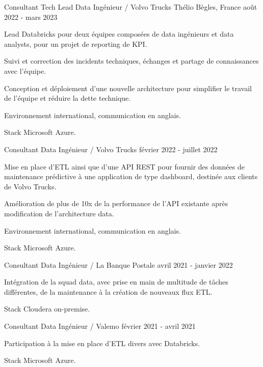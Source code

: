 \begin{cventries}
	\cventry
	{Consultant Tech Lead Data Ingénieur / Volvo Trucks}
	{Thélio}
	{Bègles, France}
	{août 2022 - mars 2023}
	{
		\begin{cvitems}
			\item {Lead Databricks pour deux équipes composées de data ingénieurs et data analysts, pour un projet de reporting de KPI.}
			\item {Suivi et correction des incidents techniques, échanges et partage de connaissances avec l'équipe.}
			\item {Conception et déploiement d'une nouvelle architecture pour simplifier le travail de l'équipe et réduire la dette technique.}
			\item {Environnement international, communication en anglais.}
			\item {Stack Microsoft Azure.}
		\end{cvitems}
	}
	
	\cventry
	{Consultant Data Ingénieur / Volvo Trucks}{}{}
	{février 2022 - juillet 2022}
	{
		\begin{cvitems}
			\item {Mise en place d'ETL ainsi que d'une API REST pour fournir des données de maintenance prédictive à une application de type dashboard, destinée aux clients de Volvo Trucks.}
			\item {Amélioration de plus de 10x de la performance de l'API existante après modification de l'architecture data.}
			\item {Environnement international, communication en anglais.}
			\item {Stack Microsoft Azure.}
		\end{cvitems}
	}
	
	\cventry
	{Consultant Data Ingénieur / La Banque Postale}{}{}
	{avril 2021 - janvier 2022}
	{
		\begin{cvitems}
			\item {Intégration de la squad data, avec prise en main de multitude de tâches différentes, de la maintenance à la création de nouveaux flux ETL.}
			\item {Stack Cloudera on-premise.}
		\end{cvitems}
	}
	
	\newpage

	\cventry
	{Consultant Data Ingénieur / Valemo}{}{}
	{février 2021 - avril 2021}
	{
		\begin{cvitems}
			\item {Participation à la mise en place d'ETL divers avec Databricks.}
			\item {Stack Microsoft Azure.}
		\end{cvitems}
	}
	

\end{cventries}
